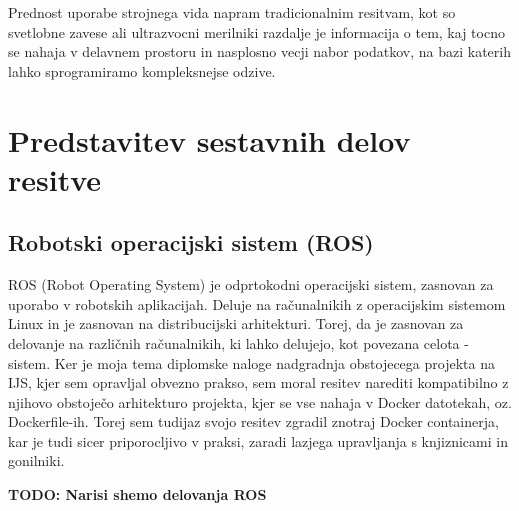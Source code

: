 \documentclass[a4paper,twoside,openright,12pt,slovene]{book}
\begin{document}
Prednost uporabe strojnega vida napram tradicionalnim resitvam, kot so svetlobne zavese ali ultrazvocni merilniki razdalje je informacija o tem, kaj tocno se nahaja v delavnem prostoru in nasplosno vecji nabor podatkov, na bazi katerih lahko sprogramiramo kompleksnejse odzive.

\chapter{Predstavitev sestavnih delov resitve} \label{opis_komponent}
\section{Robotski operacijski sistem (ROS)} \label{ROS}
ROS (Robot Operating System) je odprtokodni operacijski sistem, zasnovan za uporabo v robotskih aplikacijah. Deluje na računalnikih z operacijskim sistemom Linux in je zasnovan na distribucijski arhitekturi. Torej, da je zasnovan za delovanje na različnih računalnikih, ki lahko delujejo, kot povezana celota - sistem. Ker je moja tema diplomske naloge nadgradnja obstojecega projekta na IJS, kjer sem opravljal obvezno prakso, sem moral resitev narediti kompatibilno z njihovo obstoječo arhitekturo projekta, kjer se vse nahaja v Docker datotekah, oz. Dockerfile-ih. Torej sem tudijaz svojo resitev zgradil znotraj Docker containerja, kar je tudi sicer priporocljivo v praksi, zaradi lazjega upravljanja s knjiznicami in gonilniki. 

\textbf{TODO: Narisi shemo delovanja ROS}
\end{document}
